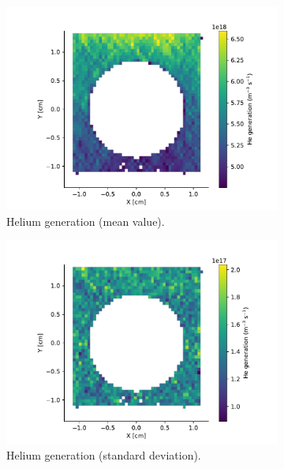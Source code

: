 \begin{figure}
    \centering
    \begin{subfigure}{0.5\linewidth}
        \includegraphics[width=\linewidth]{Figures/Chapter5/helium_generation_in_monoblock.pdf}
        \caption{Helium generation (mean value).}
    \end{subfigure}%
    \begin{subfigure}{0.5\linewidth}
        \includegraphics[width=\linewidth]{Figures/Chapter5/helium_generation_in_monoblock_std_dev.pdf}
        \caption{Helium generation (standard deviation).}
    \end{subfigure}
    \begin{subfigure}{1\linewidth}
        \centering

\end{subfigure}
\end{figure}
